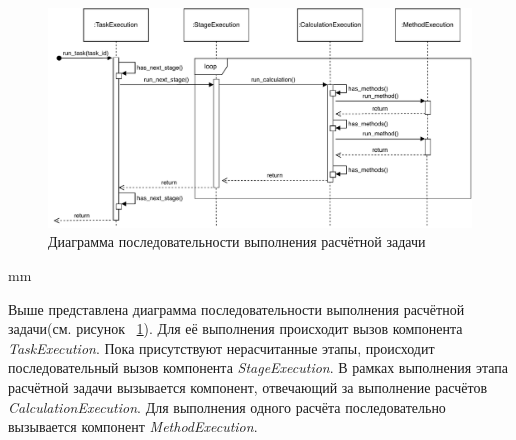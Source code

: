 \begin{figure}[H]
	\includegraphics[width=\textwidth]{architecture/pictures/orchestrator/sequence}
	\caption{Диаграмма последовательности выполнения расчётной задачи}
	\label{pic:architecture__orchestrator-sequence}
\end{figure}
 mm

Выше представлена диаграмма последовательности выполнения расчётной
задачи(см. рисунок \ \ref{pic:architecture__orchestrator-sequence}).
Для её выполнения происходит вызов компонента \textit{TaskExecution}. Пока присутствуют
нерасчитанные этапы, происходит последовательный вызов компонента \textit{StageExecution}.
В рамках выполнения этапа расчётной задачи вызывается компонент, отвечающий за выполнение расчётов
\textit{CalculationExecution}.
Для выполнения одного расчёта последовательно вызывается компонент \textit{MethodExecution}.
